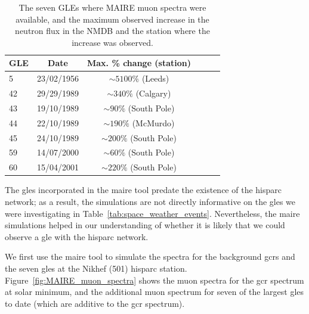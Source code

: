 \begin{table}[ht!]
	\begin{center}
		\caption{The seven GLEs where MAIRE muon spectra were available, and the maximum observed increase in the neutron flux in the NMDB and the station where the increase was observed.}
		\label{tab:MAIRE_GLEs}
		\begin{tabular}{l c c c c c}
			\hline
			{\bf GLE} & {\bf Date} & {\bf Max. \% change (station)} \\
			\hline
			5  & 23/02/1956 & $\sim 5100\%$ (Leeds) \\
			42 & 29/29/1989 & $\sim 340\%$ (Calgary) \\
			43 & 19/10/1989 & $\sim 90\%$ (South Pole) \\
			44 & 22/10/1989 & $\sim 190\%$ (McMurdo) \\
			45 & 24/10/1989 & $\sim 200\%$ (South Pole) \\
			59 & 14/07/2000 & $\sim 60\%$ (South Pole) \\
			60 & 15/04/2001 & $\sim 220\%$ (South Pole) \\
			\hline
		\end{tabular}
	\end{center}
\end{table}

The \glspl{gle} incorporated in the \gls{maire} tool predate the existence of the \gls{hisparc} network; as a result, the simulations are not directly informative on the \glspl{gle} we were investigating in Table~\ref{tab:space_weather_events}. Nevertheless, the \gls{maire} simulations helped in our understanding of whether it is likely that we could observe a \gls{gle} with the \gls{hisparc} network.


We first use the \gls{maire} tool to simulate the spectra for the background \glspl{gcr} and the seven \glspl{gle} at the Nikhef (501) \gls{hisparc} station. Figure~\ref{fig:MAIRE_muon_spectra} shows the muon spectra for the \gls{gcr} spectrum at solar minimum, and the additional muon spectrum for seven of the largest \glspl{gle} to date (which are additive to the \gls{gcr} spectrum).


